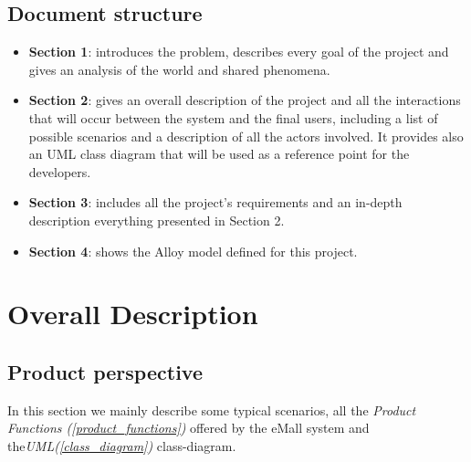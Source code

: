 \documentclass[table, 12pt]{article} %
\begin{document}
    \subsection{Document structure}
        \begin{itemize}
            \item \textbf{Section 1}: introduces the problem, describes every goal of the project and gives an analysis of the world and shared phenomena.
            \item \textbf{Section 2}: gives an overall description of the project and all the interactions that will occur between the system and the final users, including a list of possible scenarios and a description of all the actors involved. It provides also an UML class diagram that will be used as a reference point for the developers.
            \item \textbf{Section 3}: includes all the project's requirements and an in-depth description everything presented in Section 2.
            \item \textbf{Section 4}: shows the Alloy model defined for this project.
        \end{itemize}

    \newpage



    

    \section{Overall Description}

    \subsection{Product perspective}
    In this section we mainly describe some typical scenarios, all the \textit{Product Functions (\ref{product_functions})} offered by the eMall system and the\textit{UML(\ref{class_diagram})} class-diagram.
\end{document}
